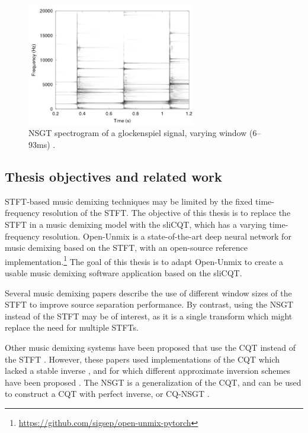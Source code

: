 \documentclass[report.tex]{subfiles}
\begin{document}
\begin{figure}[ht]
	\centering
	\includegraphics[width=0.6563\textwidth]{./images-tftheory/tf_tradeoff_balasz3.png}
	\caption{NSGT spectrogram of a glockenspiel signal, varying window (6--93ms) \parencite[4]{jaillet}.}
	\label{fig:nsgttradeoff}
\end{figure}

\subsection{Thesis objectives and related work}

STFT-based music demixing techniques may be limited by the fixed time-frequency resolution of the STFT. The objective of this thesis is to replace the STFT in a music demixing model with the sliCQT, which has a varying time-frequency resolution. Open-Unmix \parencite{umx} is a state-of-the-art deep neural network for music demixing based on the STFT, with an open-source reference implementation.\footnote{\url{https://github.com/sigsep/open-unmix-pytorch}} The goal of this thesis is to adapt Open-Unmix to create a usable music demixing software application based on the sliCQT.

Several music demixing papers \parencite{fitzgerald1, driedger, tftradeoff1, tftradeoff2} describe the use of different window sizes of the STFT to improve source separation performance. By contrast, using the NSGT instead of the STFT may be of interest, as it is a single transform which might replace the need for multiple STFTs.

Other music demixing systems have been proposed that use the CQT instead of the STFT \parencite{fitzgerald2, cqtseparation, bettermusicsep}. However, these papers used implementations of the CQT which lacked a stable inverse \parencite{lackinverse}, and for which different approximate inversion schemes have been proposed \parencite{klapuricqt, fitzgeraldcqt}. The NSGT is a generalization of the CQT, and can be used to construct a CQT with perfect inverse, or CQ-NSGT \parencite{invertiblecqt, variableq1}.
\end{document}
